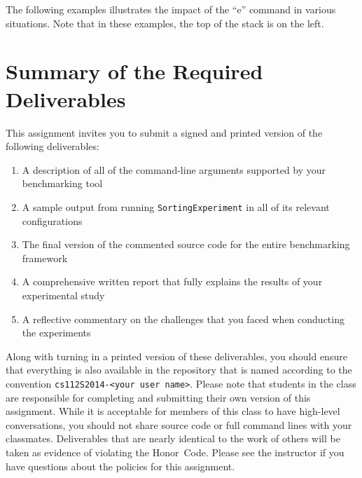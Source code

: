 The following examples illustrates the impact of the ``e'' command in various situations. Note that in these examples,
the top of the stack is on the left.


\section*{Summary of the Required Deliverables}

  This assignment invites you to submit a signed and printed version of the following deliverables: 

  \begin{enumerate} 
  \itemsep0pt
  \item A description of all of the command-line arguments supported by your benchmarking tool 

  \item A sample output from running {\tt SortingExperiment} in all of its relevant configurations

  \item The final version of the commented source code for the entire benchmarking framework 

  \item A comprehensive written report that fully explains the results of your experimental study

  \item A reflective commentary on the challenges that you faced when conducting the experiments
   
  \end{enumerate}

  Along with turning in a printed version of these deliverables, you should ensure that everything is also available in
  the repository that is named according to the convention {\tt cs112S2014-<your user name>}. Please note that students
  in the class are responsible for completing and submitting their own version of this assignment.    While it is
  acceptable for members of this class to have high-level conversations, you should not share source code or full
  command lines with your classmates.  Deliverables that are nearly identical to the work of others will be taken as
  evidence of violating the \mbox{Honor Code}.  Please see the instructor if you have questions about the policies for
  this assignment.

  
